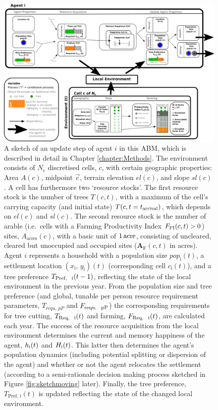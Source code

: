 \begin{figure}[H]
	\centering
	\includegraphics[width=1\textwidth]{images/SketchABM2/sketch.pdf}
	\caption{
		A sketch of an update step of agent $i$ in this ABM, which is described in detail in Chapter \ref{chapter:Methods}.
		The environment consists of $N_\text{c}$ discretised cells, $c$, with certain geographic properties: Area $A(c)$, midpoint $\vec{c}$, terrain elevation $el(c)$, and slope $sl(c)$.  %
		A cell has furthermore two `resource stocks'.
		The first resource stock is the number of trees $T(c,t)$, with a maximum of the cell's carrying capacity (and initial state) $T(c,t=t_{\rm arrival})$, which depends on $el(c)$ and $sl(c)$. 
		The second resource stock is the number of arable (i.e.\ cells with a Farming Productivity Index $F_{\rm PI}(c,t)>0$) sites, $A_\text{acres}(c)$, with a basic unit of $1\, {\rm acre}$, consisting of uncleared, cleared but unoccupied and occupied sites ($\mathbf{A}_\text{F}(c,t)$ in acres).
		Agent $i$ represents a household with a population size $pop_\text{i}(t)$, a settlement location $(x_\text{i},\, y_\text{i})(t)$ (corresponding cell $c_\text{i}(t)$), and a tree preference $T_\text{Pref, \, i}(t-1)$, reflecting the state of the local environment in the previous year. From the population size and tree preference (and global, tunable per person resource requirement parameters, $T_{requ, \, pP}$ and  $F_\text{requ, \, pP}$) the corresponding requirements for tree cutting, $T_\text{Req, \, i}(t)$ and farming, $F_\text{Req, \, i}(t)$, are calculated each year.
		The success of the resource acquisition from the local environment determines the current and memory happiness of the agent, $h_{\rm i}(t)$ and $H_{\rm i}(t)$. %
		This latter then determines the agent's population dynamics (including potential splitting or dispersion of the agent) and whether or not the agent relocates the settlement (according to a semi-rationale decision making process sketched in Figure \ref{fig:sketchmoving} later).
		Finally, the tree preference, $T_\text{Pref, i}(t)$ is updated reflecting the state of the changed local environment.
	}
	\label{fig:SketchABM}
\end{figure}

